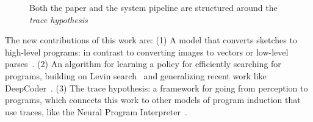 \documentclass{article}
\theoremstyle{definition}
\begin{document}
\begin{figure}[h]
  \caption{Both the paper and the system pipeline are structured around the \emph{trace hypothesis}}\label{roadmap}
\end{figure}

The new contributions of this work are:
(1) A model that converts sketches to high-level programs:
in contrast to converting images to vectors or low-level parses~\citep{huang2017shape,Nishida:2016:ISU:2897824.2925951,nsd,DBLP:journals/corr/Beltramelli17,im2latex}.
(2) An algorithm for learning a policy for efficiently searching for programs,
building on Levin search~\citep{levin1973universal}
and generalizing recent work like DeepCoder~\citep{BalGauBroetal16}.
(3) The trace hypothesis: a framework for going from perception to programs,
which connects this work to other models of program induction that use traces,
like the  Neural Program Interpreter~\citep{DBLP:journals/corr/ReedF15}.
  


\end{document}
